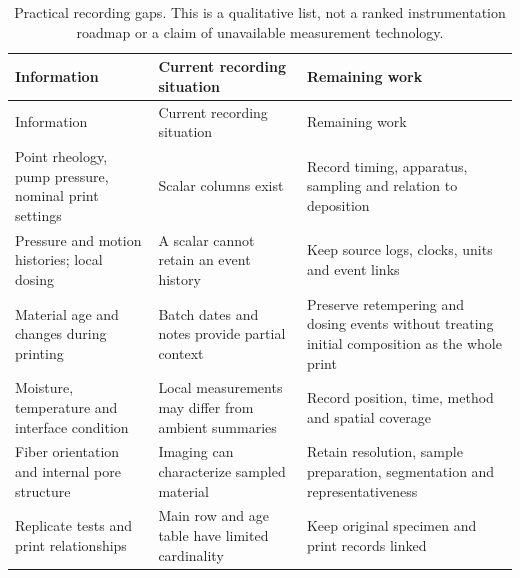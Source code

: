 \documentclass[
  american,
  11pt,
  letterpaper,
]{article}
\begin{document}
\begin{longtable}[]{@{}
  >{\raggedright\arraybackslash}p{}
  >{\raggedright\arraybackslash}p{}
  >{\raggedright\arraybackslash}p{}@{}}
\caption{Practical recording gaps. This is a qualitative list, not a
ranked instrumentation roadmap or a claim of unavailable measurement
technology.}\tabularnewline
\toprule\noalign{}
\begin{minipage}[b]{\linewidth}\raggedright
Information
\end{minipage} & \begin{minipage}[b]{\linewidth}\raggedright
Current recording situation
\end{minipage} & \begin{minipage}[b]{\linewidth}\raggedright
Remaining work
\end{minipage} \\
\midrule\noalign{}
\endfirsthead
\toprule\noalign{}
\begin{minipage}[b]{\linewidth}\raggedright
Information
\end{minipage} & \begin{minipage}[b]{\linewidth}\raggedright
Current recording situation
\end{minipage} & \begin{minipage}[b]{\linewidth}\raggedright
Remaining work
\end{minipage} \\
\midrule\noalign{}
\endhead
\bottomrule\noalign{}
\endlastfoot
Point rheology, pump pressure, nominal print settings & Scalar columns
exist & Record timing, apparatus, sampling and relation to deposition \\
Pressure and motion histories; local dosing & A scalar cannot retain an
event history & Keep source logs, clocks, units and event links \\
Material age and changes during printing & Batch dates and notes provide
partial context & Preserve retempering and dosing events without
treating initial composition as the whole print \\
Moisture, temperature and interface condition & Local measurements may
differ from ambient summaries & Record position, time, method and
spatial coverage \\
Fiber orientation and internal pore structure & Imaging can characterize
sampled material & Retain resolution, sample preparation, segmentation
and representativeness \\
Replicate tests and print relationships & Main row and age table have
limited cardinality & Keep original specimen and print records linked \\
\end{longtable}
\end{document}

